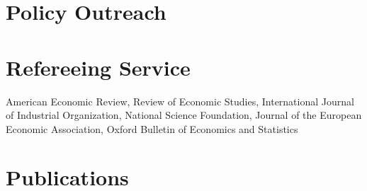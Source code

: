 \documentclass[11pt,a4paper]{article}
\begin{document}
\section*{Policy Outreach}

\section*{Refereeing Service}
American Economic Review, Review of Economic Studies, International Journal of Industrial Organization, National Science Foundation, Journal of the European Economic Association, Oxford Bulletin of Economics and Statistics


\section*{Publications}
\vspace{-0.8cm}
\nocite{*}


\end{document}
